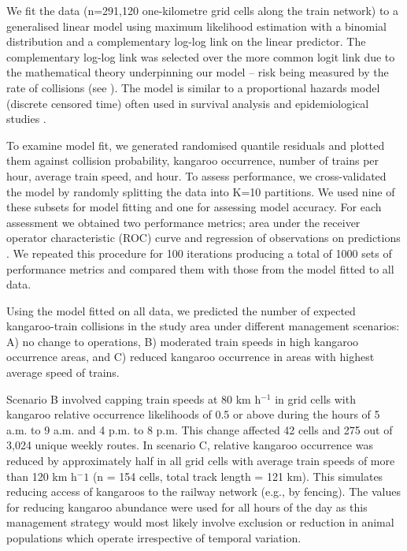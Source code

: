 We fit the data (n=291,120 one-kilometre grid cells along the train network) to a generalised linear model \citep{mccu89} using maximum likelihood estimation with a binomial distribution and a complementary log-log link on the linear predictor.  The complementary log-log link was selected over the more common logit link due to the mathematical theory underpinning our model -- risk being measured by the rate of collisions (see ).  The model is similar to a proportional hazards model (discrete censored time) often used in survival analysis and epidemiological studies \citep{cox84}.

To examine model fit, we generated randomised quantile residuals \citep{dunn96} and plotted them against collision probability, kangaroo occurrence, number of trains per hour, average train speed, and hour. To assess performance, we cross-validated the model by randomly splitting the data into K=10 partitions. We used nine of these subsets for model fitting and one for assessing model accuracy.  For each assessment we obtained two performance metrics; area under the receiver operator characteristic (ROC) curve \citep{metz78} and regression of observations on predictions \citep{cox89,mill91}. We repeated this procedure for 100 iterations producing a total of 1000 sets of performance metrics and compared them with those from the model fitted to all data.

Using the model fitted on all data, we predicted the number of expected kangaroo-train collisions in the study area under different management scenarios: 
A) no change to operations, 
B) moderated train speeds in high kangaroo occurrence areas, and 
C) reduced kangaroo occurrence in areas with highest average speed of trains.

Scenario B involved capping train speeds at 80 km h$^{-1}$ in grid cells with kangaroo relative occurrence likelihoods of 0.5 or above during the hours of 5 a.m. to 9 a.m. and 4 p.m. to 8 p.m.  This change affected 42 cells and 275 out of 3,024 unique weekly routes.  In scenario C, relative kangaroo occurrence was reduced by approximately half in all grid cells with average train speeds of more than 120 km h$^{-}1$ (n = 154 cells, total track length = 121 km). This simulates reducing access of kangaroos to the railway network (e.g., by fencing).  The values for reducing kangaroo abundance were used for all hours of the day as this management strategy would most likely involve exclusion or reduction in animal populations which operate irrespective of temporal variation.

